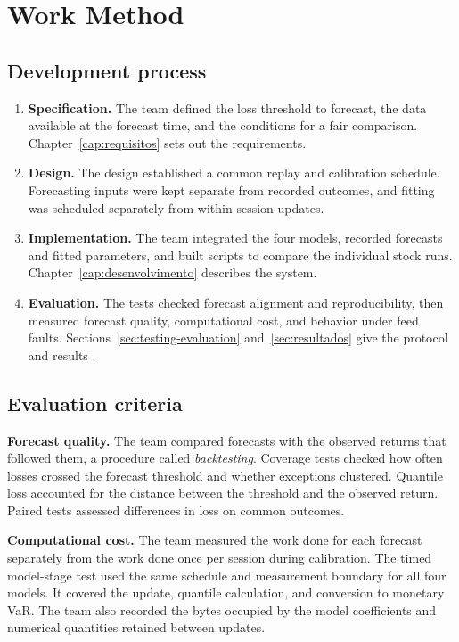 \documentclass[
	12pt,				%
	openright,			%
	twoside,			%
	a4paper,
	chapter=TITLE,
	english				%
	]{abntex2}
\begin{document}
\chapter{Work Method} \label{cap:metodo}

\section{Development process}

\begin{enumerate}
  \item \textbf{Specification.} The team defined the loss threshold to forecast, the data available at the forecast time, and the conditions for a fair comparison. Chapter~\ref{cap:requisitos} sets out the requirements.
  \item \textbf{Design.} The design established a common replay and calibration schedule. Forecasting inputs were kept separate from recorded outcomes, and fitting was scheduled separately from within-session updates.
  \item \textbf{Implementation.} The team integrated the four models, recorded forecasts and fitted parameters, and built scripts to compare the individual stock runs. Chapter~\ref{cap:desenvolvimento} describes the system.
  \item \textbf{Evaluation.} The tests checked forecast alignment and reproducibility, then measured forecast quality, computational cost, and behavior under feed faults. Sections~\ref{sec:testing-evaluation} and~\ref{sec:resultados} give the protocol and results \cite{project-comparison,project-atam}.
\end{enumerate}

\section{Evaluation criteria}

\textbf{Forecast quality.} The team compared forecasts with the observed returns that followed them, a procedure called \emph{backtesting}. Coverage tests checked how often losses crossed the forecast threshold and whether exceptions clustered. Quantile loss accounted for the distance between the threshold and the observed return. Paired tests assessed differences in loss on common outcomes.

\textbf{Computational cost.} The team measured the work done for each forecast separately from the work done once per session during calibration. The timed model-stage test used the same schedule and measurement boundary for all four models. It covered the update, quantile calculation, and conversion to monetary VaR. The team also recorded the bytes occupied by the model coefficients and numerical quantities retained between updates.
\end{document}
